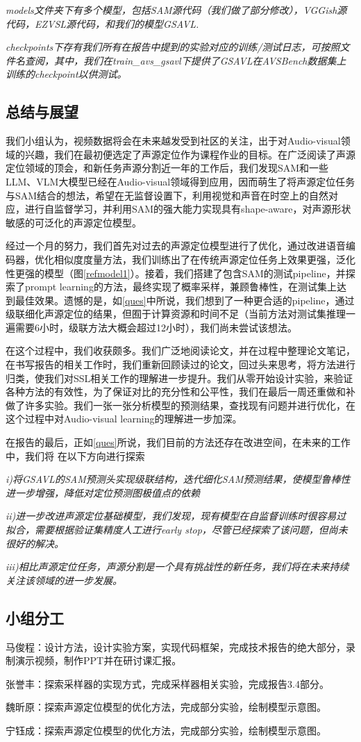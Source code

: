 \documentclass[12pt]{article}
\begin{document}
\textit{models文件夹下有多个模型，包括SAM源代码（我们做了部分修改），VGGish源代码，EZVSL源代码，和我们的模型GSAVL.}

\textit{checkpoints下存有我们所有在报告中提到的实验对应的训练/测试日志，可按照文件名查阅，其中，我们在train_avs_gsavl下提供了GSAVL在AVSBench数据集上训练的checkpoint以供测试。}

\subsection{总结与展望}
我们小组认为，视频数据将会在未来越发受到社区的关注，出于对Audio-visual领域的兴趣，我们在最初便选定了声源定位作为课程作业的目标。在广泛阅读了声源定位领域的顶会，和新任务声源分割近一年的工作后，我们发现SAM和一些LLM、VLM大模型已经在Audio-visual领域得到应用，因而萌生了将声源定位任务与SAM结合的想法，希望在无监督设置下，利用视觉和声音在时空上的自然对应，进行自监督学习，并利用SAM的强大能力实现具有shape-aware，对声源形状敏感的可泛化的声源定位模型。

经过一个月的努力，我们首先对过去的声源定位模型进行了优化，通过改进语音编码器，优化相似度度量方法，我们训练出了在传统声源定位任务上效果更强，泛化性更强的模型（图\ref{refmodel1}）。接着，我们搭建了包含SAM的测试pipeline，并探索了prompt learning的方法，最终实现了概率采样，兼顾鲁棒性，在测试集上达到最佳效果。遗憾的是，如\ref{ques}中所说，我们想到了一种更合适的pipeline，通过级联细化声源定位的结果，但囿于计算资源和时间不足（当前方法对测试集推理一遍需要6小时，级联方法大概会超过12小时），我们尚未尝试该想法。

在这个过程中，我们收获颇多。我们广泛地阅读论文，并在过程中整理论文笔记，在书写报告的相关工作时，我们重新回顾读过的论文，回过头来思考，将方法进行归类，使我们对SSL相关工作的理解进一步提升。我们从零开始设计实验，来验证各种方法的有效性，为了保证对比的充分性和公平性，我们在最后一周还重做和补做了许多实验。我们一张一张分析模型的预测结果，查找现有问题并进行优化，在这个过程中对Audio-visual learning的理解进一步加深。

在报告的最后，正如\ref{ques}所说，我们目前的方法还存在改进空间，在未来的工作中，我们将
在以下方向进行探索

\textit{i)将GSAVL的SAM预测头实现级联结构，迭代细化SAM预测结果，使模型鲁棒性进一步增强，降低对定位预测图极值点的依赖}

\textit{ii)进一步改进声源定位基础模型，我们发现，现有模型在自监督训练时很容易过拟合，需要根据验证集精度人工进行early stop，尽管\cite{23}已经探索了该问题，但尚未很好的解决。}

\textit{iii)相比声源定位任务，声源分割是一个具有挑战性的新任务，我们将在未来持续关注该领域的进一步发展。}
\subsection{小组分工}
马俊程：设计方法，设计实验方案，实现代码框架，完成技术报告的绝大部分，录制演示视频，制作PPT并在研讨课汇报。

张誉丰：探索采样器的实现方式，完成采样器相关实验，完成报告3.4部分。

魏昕原：探索声源定位模型的优化方法，完成部分实验，绘制模型示意图。

宁钰成：探索声源定位模型的优化方法，完成部分实验，绘制模型示意图。


\end{document}
